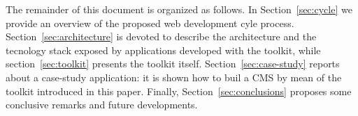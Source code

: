 The remainder of this document is organized as follows. In
Section~\ref{sec:cycle} we provide an overview of the proposed web development cyle process. Section~\ref{sec:architecture} is devoted to describe the architecture and the tecnology stack exposed by applications developed with the toolkit, while section~\ref{sec:toolkit} presents the toolkit itself. Section~\ref{sec:case-study} reports about a case-study application: it is shown how to buil a CMS by mean of the toolkit introduced in this paper. Finally, Section~\ref{sec:conclusions} proposes some conclusive remarks and future developments.

